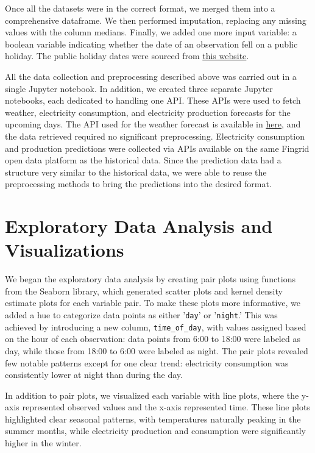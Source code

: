 \documentclass{article}
\numberwithin{equation}{section}
\begin{document}
Once all the datasets were in the correct format, we merged them into a comprehensive dataframe. We then performed imputation, replacing any missing values with the column medians. Finally, we added one more input variable: a boolean variable indicating whether the date of an observation fell on a public holiday. The public holiday dates were sourced from \href{https://www.officeholidays.com/countries/finland/2021}{this website}.

All the data collection and preprocessing described above was carried out in a single Jupyter notebook. In addition, we created three separate Jupyter notebooks, each dedicated to handling one API. These APIs were used to fetch weather, electricity consumption, and electricity production forecasts for the upcoming days. The API used for the weather forecast is available in \href{https://api.open-meteo.com/v1/forecast}{here}, and the data retrieved required no significant preprocessing. Electricity consumption and production predictions were collected via APIs available on the same Fingrid open data platform as the historical data. Since the prediction data had a structure very similar to the historical data, we were able to reuse the preprocessing methods to bring the predictions into the desired format.

\section{Exploratory Data Analysis and Visualizations}

We began the exploratory data analysis by creating pair plots using functions from the Seaborn library, which generated scatter plots and kernel density estimate plots for each variable pair. To make these plots more informative, we added a hue to categorize data points as either '\verb|day|' or '\verb|night|.' This was achieved by introducing a new column, \verb|time_of_day|, with values assigned based on the hour of each observation: data points from 6:00 to 18:00 were labeled as day, while those from 18:00 to 6:00 were labeled as night. The pair plots revealed few notable patterns except for one clear trend: electricity consumption was consistently lower at night than during the day.

In addition to pair plots, we visualized each variable with line plots, where the y-axis represented observed values and the x-axis represented time. These line plots highlighted clear seasonal patterns, with temperatures naturally peaking in the summer months, while electricity production and consumption were significantly higher in the winter.
\end{document}
